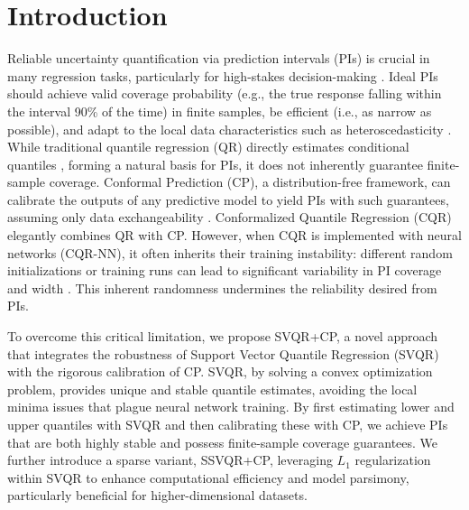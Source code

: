 \documentclass{article}
\begin{document}
\section{Introduction}
Reliable uncertainty quantification via prediction intervals (PIs) is crucial in many regression tasks, particularly for high-stakes decision-making \citep{Romano2019ConformalizedQR}. Ideal PIs should achieve valid coverage probability (e.g., the true response falling within the interval 90\% of the time) in finite samples, be efficient (i.e., as narrow as possible), and adapt to the local data characteristics such as heteroscedasticity \citep{Romano2019ConformalizedQR}.
While traditional quantile regression (QR) directly estimates conditional quantiles \citep{Koenker2005}, forming a natural basis for PIs, it does not inherently guarantee finite-sample coverage. Conformal Prediction (CP), a distribution-free framework, can calibrate the outputs of any predictive model to yield PIs with such guarantees, assuming only data exchangeability \citep{Shafer2008TutorialOC, Vovk2005AlgorithmicLI}.
Conformalized Quantile Regression (CQR) \citep{Romano2019ConformalizedQR} elegantly combines QR with CP. However, when CQR is implemented with neural networks (CQR-NN), it often inherits their training instability: different random initializations or training runs can lead to significant variability in PI coverage and width \citep{Xu2020UnderTH, Park2022UnderstandingUB}. This inherent randomness undermines the reliability desired from PIs.

To overcome this critical limitation, we propose SVQR+CP, a novel approach that integrates the robustness of Support Vector Quantile Regression (SVQR) \citep{Takeuchi2006NonparametricQE} with the rigorous calibration of CP. SVQR, by solving a convex optimization problem, provides unique and stable quantile estimates, avoiding the local minima issues that plague neural network training. By first estimating lower and upper quantiles with SVQR and then calibrating these with CP, we achieve PIs that are both highly stable and possess finite-sample coverage guarantees. We further introduce a sparse variant, SSVQR+CP, leveraging $L_1$ regularization within SVQR to enhance computational efficiency and model parsimony, particularly beneficial for higher-dimensional datasets.
\end{document}

